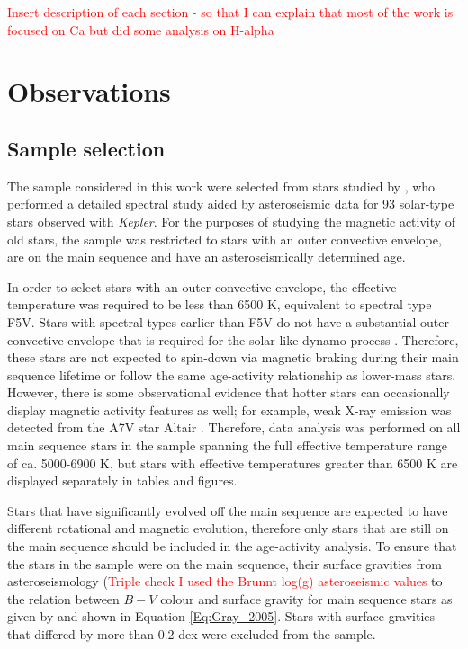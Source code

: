 \textcolor{red}{Insert description of each section - so that I can explain that most of the work is focused on Ca but did some analysis on H-alpha}

\section{Observations}
\subsection{Sample selection}
\label{Chp4_obs_sample_selection}
The sample considered in this work were selected from stars studied by \citet{Bruntt_etal_2012}, who performed a detailed spectral study aided by asteroseismic data for 93 solar-type stars observed with \textit{Kepler}. For the purposes of studying the magnetic activity of old stars, the sample was restricted to stars with an outer convective envelope, are on the main sequence and have an asteroseismically determined age.

In order to select stars with an outer convective envelope, the effective temperature was required to be less than 6500 K, equivalent to spectral type F5V. Stars with spectral types earlier than F5V do not have a substantial outer convective envelope that is required for the solar-like dynamo process \citep{Pinsonneault_etal_2001}. Therefore, these stars are not expected to spin-down via magnetic braking during their main sequence lifetime or follow the same age-activity relationship as lower-mass stars. However, there is some observational evidence that hotter stars can occasionally display magnetic activity features as well; for example, weak X-ray emission was detected from the A7V star Altair \citep{Robrade_Schmitt_2009}. Therefore, data analysis was performed on all main sequence stars in the sample spanning the full effective temperature range of ca. 5000-6900 K, but stars with effective temperatures greater than 6500 K are displayed separately in tables and figures.

Stars that have significantly evolved off the main sequence are expected to have different rotational and magnetic evolution, therefore only stars that are still on the main sequence should be included in the age-activity analysis. To ensure that the stars in the sample were on the main sequence, their surface gravities \citep{Bruntt_etal_2012} from asteroseismology (\textcolor{red}{Triple check I used the Brunnt log(g) asteroseismic values} to the relation between $B-V$ colour and surface gravity for main sequence stars as given by \citet{Gray_2005} and shown in Equation \ref{Eq:Gray_2005}. Stars with surface gravities that differed by more than 0.2 dex were excluded from the sample.

